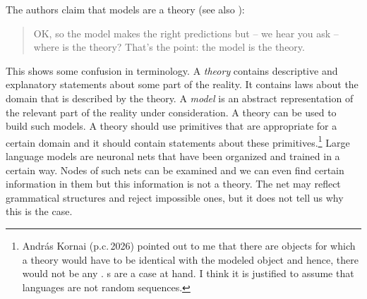 \noindent
The authors claim that models are a theory (see also \citealt[360]{Piantadosi2024a}):
\begin{quote}
OK, so the model makes the right predictions but -- we hear you ask -- where is the theory? That's
the point: the model is the theory.
\citep[]{AmbridgeBlything2024a}
\end{quote}
This shows some confusion in terminology. 
A \emph{theory} contains descriptive and explanatory statements about some part of the reality. It contains
laws about the domain that is described by the theory. A \emph{model} is an abstract representation of the
relevant part of the reality under consideration. A theory can be used to build such models.
A theory should use primitives that are appropriate for a certain domain and it should contain statements about these
primitives.\footnote{
  András Kornai (p.c.\,2026) pointed out to me that there are objects for which a theory would have
  to be identical with the modeled object and hence, there would not be any . s are a case at hand. I think it is
  justified to assume that languages are not random sequences.
} Large language models are neuronal nets that have been organized and trained in a
certain way. Nodes of such nets can be examined and we can even find certain information in them
\citep{ManningClarkHewitt2020a,ZhangBowman2018a} but this information is not a theory. The net may
reflect grammatical structures and reject impossible ones, but it does not tell us why this is the case.

